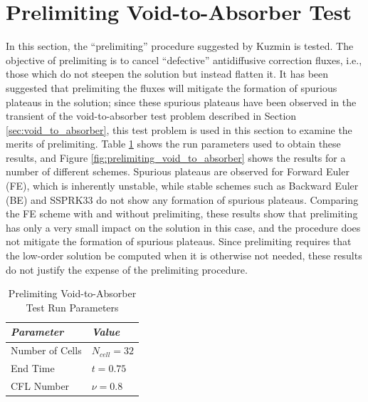 \section{Prelimiting Void-to-Absorber Test}
\label{sec:prelimiting_void_to_absorber}

In this section, the ``prelimiting'' procedure suggested by Kuzmin
\cite{kuzmin_FCT} is tested. The objective of prelimiting is to
cancel ``defective'' antidiffusive correction fluxes, i.e., those
which do not steepen the solution but instead flatten it. It
has been suggested that prelimiting the fluxes will mitigate
the formation of spurious plateaus in the solution; since these
spurious plateaus have been observed in the transient of the
void-to-absorber test problem described in Section \ref{sec:void_to_absorber},
this test problem is used in this section to examine the merits
of prelimiting.
Table \ref{tab:prelimiting_void_to_absorber_run_parameters}
shows the run parameters used to obtain these results, and Figure
\ref{fig:prelimiting_void_to_absorber} shows the results
for a number of different schemes. Spurious plateaus are observed
for Forward Euler (FE), which is inherently unstable, while
stable schemes such as Backward Euler (BE) and SSPRK33 do not
show any formation of spurious plateaus. Comparing the FE
scheme with and without prelimiting, these results show that
prelimiting has only a very small impact on the solution in this
case, and the procedure does not mitigate the formation of
spurious plateaus. Since prelimiting requires that the
low-order solution be computed when it is otherwise not needed,
these results do not justify the expense of the prelimiting
procedure.
\begin{table}[ht]\caption{Prelimiting Void-to-Absorber Test Run Parameters}
\label{tab:prelimiting_void_to_absorber_run_parameters}
\centering
\begin{tabular}{l l}\toprule
\emph{Parameter} & \emph{Value}\\\midrule
Number of Cells & $N_{cell} = 32$\\
End Time & $t = 0.75$\\
CFL Number & $\nu = 0.8$\\
\bottomrule\end{tabular}
\end{table}
